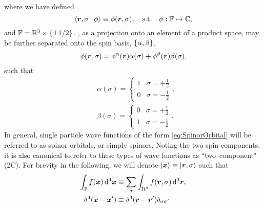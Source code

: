 where we have defined
\begin{equation}
  \label{eq:SpinorOrbital}
  \left\langle \boldsymbol{r},\sigma \left\vert\right. \phi \right\rangle \equiv \phi(\boldsymbol{r},\sigma), \quad \mathrm{s.t.} \quad \phi : \mathbb F \mapsto \mathbb C,
\end{equation}
and $\mathbb F = \mathbb R^3 \times \left \lbrace \pm1/2 \right\rbrace$. 
, as a projection onto
an element of a product space, may be further separated onto the spin basis, $\left \lbrace \alpha,\beta \right\rbrace$,
\begin{align}
  \phi(\boldsymbol{r},\sigma) = \phi^\alpha(\boldsymbol{r})\alpha(\sigma) + \phi^\beta(\boldsymbol{r})\beta(\sigma),
\end{align}
such that
\begin{align}
  &\alpha(\sigma) = \begin{cases} 1 & \sigma = +\frac{1}{2} \\ 0 & \sigma = -\frac{1}{2} \end{cases}, \\ 
  &\beta(\sigma)  = \begin{cases} 0 & \sigma = +\frac{1}{2} \\ 1 & \sigma = -\frac{1}{2} \end{cases}.
\end{align}
In general, single particle wave functions of the form \cref{eq:SpinorOrbital} will be referred to as spinor orbitals, or simply spinors. Noting the two spin components, it is also canonical to refer to these types of wave functions as ``two--component" (2C).
For brevity in the following, we will denote $\left\vert \boldsymbol{x} \right\rangle \equiv \left\vert \boldsymbol{r},\sigma \right\rangle$ such that
\begin{subequations}
\begin{align}
\int_{\mathbb F} f(\boldsymbol{x}) \,\mathrm{d}^4 \boldsymbol{x} &\equiv \sum_\sigma \int_{\mathrm{R}^3} f(\boldsymbol{r},\sigma) \,\mathrm{d}^3 \boldsymbol{r},\\
\delta^4(\boldsymbol{x} - \boldsymbol{x}') &\equiv \delta^3(\boldsymbol{r} - \boldsymbol{r}')\delta_{\sigma\sigma'}
\end{align}
\end{subequations}

